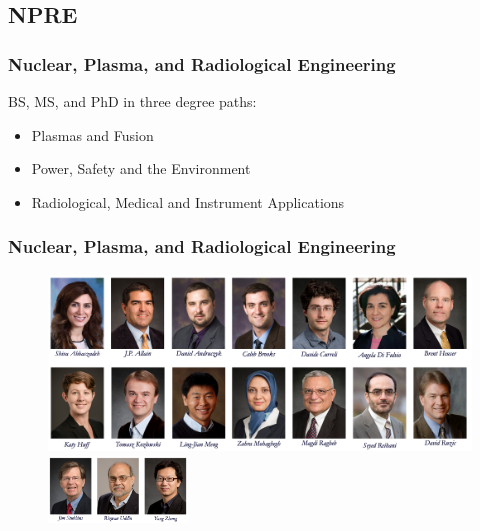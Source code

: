 \subsection{NPRE}
\begin{frame}
        \frametitle{Nuclear, Plasma, and Radiological Engineering}
        BS, MS, and PhD in three degree paths:
        \begin{itemize}
              \item Plasmas and Fusion
              \item Power, Safety and the Environment
              \item Radiological, Medical and Instrument Applications
        \end{itemize}

\end{frame}
\begin{frame}
        \frametitle{Nuclear, Plasma, and Radiological Engineering}
               \begin{figure}[t]
                \vspace*{-0.1in}
                \includegraphics[width=\textwidth]{./images/npre-fac1.png}
                \includegraphics[width=0.33\textwidth]{./images/npre-fac2.png}
               \end{figure}            
        
\end{frame}


